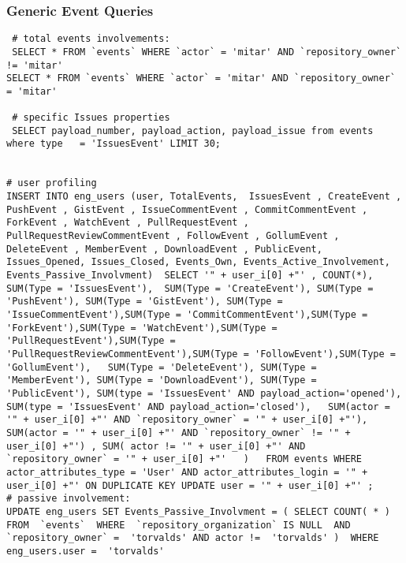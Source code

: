 \documentclass[a4paper,10pt]{article}
\begin{document}
\subsubsection{Generic Event Queries}
\begin{lstlisting}
 # total events involvements:
 SELECT * FROM `events` WHERE `actor` = 'mitar' AND `repository_owner` != 'mitar'
SELECT * FROM `events` WHERE `actor` = 'mitar' AND `repository_owner` = 'mitar'

 # specific Issues properties
 SELECT payload_number, payload_action, payload_issue from events where type   = 'IssuesEvent' LIMIT 30;


# user profiling
INSERT INTO eng_users (user, TotalEvents,  IssuesEvent , CreateEvent , PushEvent , GistEvent , IssueCommentEvent , CommitCommentEvent , ForkEvent , WatchEvent , PullRequestEvent , PullRequestReviewCommentEvent , FollowEvent , GollumEvent , DeleteEvent , MemberEvent , DownloadEvent , PublicEvent, Issues_Opened, Issues_Closed, Events_Own, Events_Active_Involvement, Events_Passive_Involvment)  SELECT '" + user_i[0] +"' , COUNT(*),  SUM(Type = 'IssuesEvent'),  SUM(Type = 'CreateEvent'), SUM(Type = 'PushEvent'), SUM(Type = 'GistEvent'), SUM(Type = 'IssueCommentEvent'),SUM(Type = 'CommitCommentEvent'),SUM(Type = 'ForkEvent'),SUM(Type = 'WatchEvent'),SUM(Type = 'PullRequestEvent'),SUM(Type = 'PullRequestReviewCommentEvent'),SUM(Type = 'FollowEvent'),SUM(Type = 'GollumEvent'),   SUM(Type = 'DeleteEvent'), SUM(Type = 'MemberEvent'), SUM(Type = 'DownloadEvent'), SUM(Type = 'PublicEvent'), SUM(type = 'IssuesEvent' AND payload_action='opened'), SUM(type = 'IssuesEvent' AND payload_action='closed'),   SUM(actor = '" + user_i[0] +"' AND `repository_owner` = '" + user_i[0] +"'),  SUM(actor = '" + user_i[0] +"' AND `repository_owner` != '" + user_i[0] +"') , SUM( actor != '" + user_i[0] +"' AND `repository_owner` = '" + user_i[0] +"'   )   FROM events WHERE actor_attributes_type = 'User' AND actor_attributes_login = '" + user_i[0] +"' ON DUPLICATE KEY UPDATE user = '" + user_i[0] +"' ;
# passive involvement:
UPDATE eng_users SET Events_Passive_Involvment = ( SELECT COUNT( * )  FROM  `events`  WHERE  `repository_organization` IS NULL  AND   `repository_owner` =  'torvalds' AND actor !=  'torvalds' )  WHERE eng_users.user =  'torvalds'
\end{lstlisting}
\end{document}
